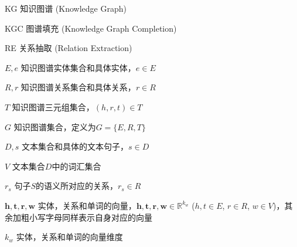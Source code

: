 \begin{denotation}[3cm]
\item[KG] 知识图谱 (Knowledge Graph)
\item[KGC] 图谱填充 (Knowledge Graph Completion)
\item[RE] 关系抽取 (Relation Extraction)
\item[$E, e$] 知识图谱实体集合和具体实体，$e \in E$
\item[$R, r$] 知识图谱关系集合和具体关系，$r \in R$
\item[$T$] 知识图谱三元组集合，$(h, r, t) \in T$
\item[$G$] 知识图谱集合，定义为$G = \{E, R, T\}$
\item[$D, s$] 文本集合和具体的文本句子，$s \in D$
\item[$V$] 文本集合$D$中的词汇集合
\item[$r_s$] 句子$S$的语义所对应的关系，$r_s \in R$
\item[$\textbf{h}, \textbf{t}, \textbf{r}, \textbf{w}$]	实体，关系和单词的向量，$\mathbf{h}, \mathbf{t}, \mathbf{r}, \mathbf{w} \in \mathbb{R}^{k_w}$ ($h, t \in E$, $r \in R$, $w \in V$)，其余加粗小写字母同样表示自身对应的向量
\item[$k_w$] 实体，关系和单词的向量维度
\end{denotation}
